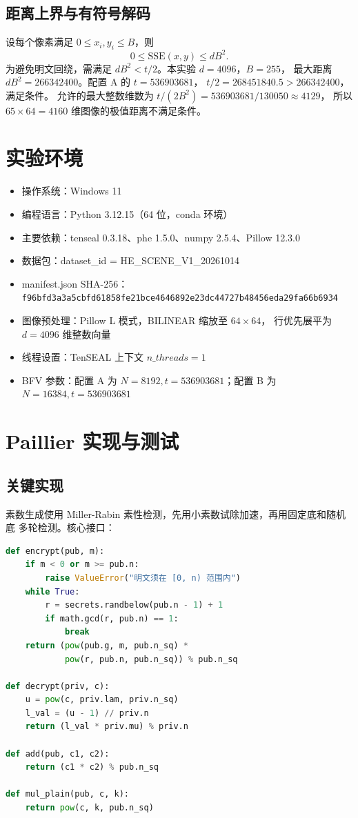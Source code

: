 \documentclass{SYSUReport}
\begin{document}
\subsection{距离上界与有符号解码}
设每个像素满足 $0 \le x_i, y_i \le B$，则
$$0 \le \mathrm{SSE}(x,y) \le d B^2.$$
为避免明文回绕，需满足 $dB^2 < t/2$。本实验 $d = 4096$，$B = 255$，
最大距离 $dB^2 = 266342400$。配置 A 的 $t = 536903681$，
$t/2 = 268451840.5 > 266342400$，满足条件。
允许的最大整数维数为 $t / (2B^2) = 536903681 / 130050 \approx 4129$，
所以 $65 \times 64 = 4160$ 维图像的极值距离不满足条件。

\section{实验环境}

\begin{itemize}
  \item 操作系统：Windows 11
  \item 编程语言：Python 3.12.15（64 位，conda 环境）
  \item 主要依赖：tenseal 0.3.18、phe 1.5.0、numpy 2.5.4、Pillow 12.3.0
  \item 数据包：dataset\_id = HE\_SCENE\_V1\_20261014
  \item manifest.json SHA-256：\texttt{f96bfd3a3a5cbfd61858fe21bce4646892e23dc44727b48456eda29fa66b6934}
  \item 图像预处理：Pillow L 模式，BILINEAR 缩放至 $64 \times 64$，
        行优先展平为 $d = 4096$ 维整数向量
  \item 线程设置：TenSEAL 上下文 $n\_threads = 1$
  \item BFV 参数：配置 A 为 $N=8192, t=536903681$；配置 B 为 $N=16384, t=536903681$
\end{itemize}

\section{Paillier 实现与测试}

\subsection{关键实现}
素数生成使用 Miller-Rabin 素性检测，先用小素数试除加速，再用固定底和随机底
多轮检测。核心接口：

\begin{lstlisting}[language=Python]
def encrypt(pub, m):
    if m < 0 or m >= pub.n:
        raise ValueError("明文须在 [0, n) 范围内")
    while True:
        r = secrets.randbelow(pub.n - 1) + 1
        if math.gcd(r, pub.n) == 1:
            break
    return (pow(pub.g, m, pub.n_sq) *
            pow(r, pub.n, pub.n_sq)) % pub.n_sq

def decrypt(priv, c):
    u = pow(c, priv.lam, priv.n_sq)
    l_val = (u - 1) // priv.n
    return (l_val * priv.mu) % priv.n

def add(pub, c1, c2):
    return (c1 * c2) % pub.n_sq

def mul_plain(pub, c, k):
    return pow(c, k, pub.n_sq)
\end{lstlisting}
\end{document}
